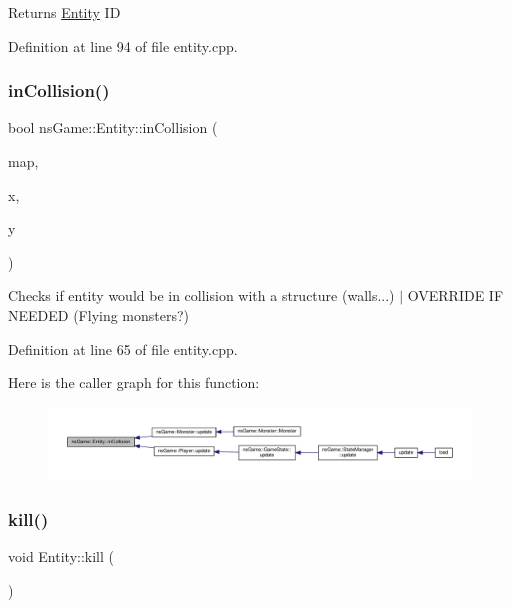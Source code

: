 \begin{DoxyReturn}{Returns}
\hyperlink{structns_game_1_1_entity}{Entity} ID 
\end{DoxyReturn}


Definition at line 94 of file entity.\+cpp.

\mbox{\label{structns_game_1_1_entity_a5dd00624fa76be09de80a6d2a982ea09}} 
\subsubsection{\texorpdfstring{in\+Collision()}{inCollision()}}
{\footnotesize\ttfamily bool ns\+Game\+::\+Entity\+::in\+Collision (\begin{DoxyParamCaption}\item[{\hyperlink{type_8h_a64a592133575ccebb1b36453acbec02b}{C\+Mat}}]{map,  }\item[{unsigned}]{x,  }\item[{unsigned}]{y }\end{DoxyParamCaption})}



Checks if entity would be in collision with a structure (walls...) $\vert$ O\+V\+E\+R\+R\+I\+DE IF N\+E\+E\+D\+ED (Flying monsters?) 



Definition at line 65 of file entity.\+cpp.

Here is the caller graph for this function\+:\nopagebreak
\begin{figure}[H]
\begin{center}
\leavevmode
\includegraphics[width=350pt]{structns_game_1_1_entity_a5dd00624fa76be09de80a6d2a982ea09_icgraph}
\end{center}
\end{figure}
\mbox{\label{structns_game_1_1_entity_a522648b330daab91b49f78f0737a943f}} 
\subsubsection{\texorpdfstring{kill()}{kill()}}
{\footnotesize\ttfamily void Entity\+::kill (\begin{DoxyParamCaption}{ }\end{DoxyParamCaption})}



